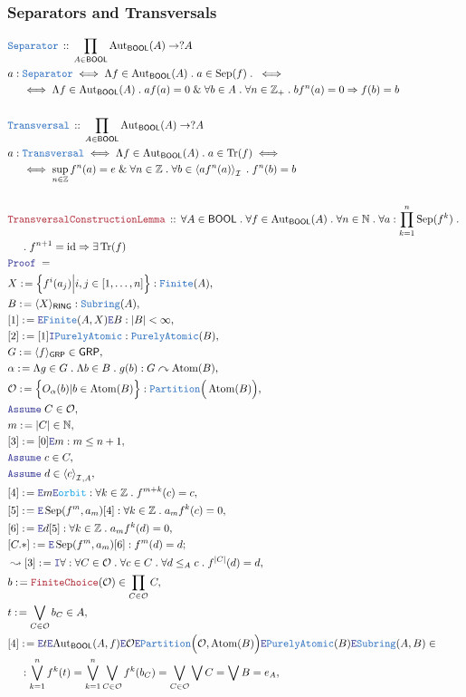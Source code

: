 \documentclass[12pt]{scrartcl}
\newcommand{\TYPE}[1]{\textcolor{NavyBlue}{\mathtt{#1}}}
\newcommand{\FUNC}[1]{\textcolor{Cerulean}{\mathtt{#1}}}
\newcommand{\LOGIC}[1]{\textcolor{Blue}{\mathtt{#1}}}
\newcommand{\THM}[1]{\textcolor{Maroon}{\mathtt{#1}}}
\renewcommand{\.}{\; . \;}
\newcommand{\de}{: \kern 0.1pc =}
\newcommand{\Theorem}[2]{& \THM{#1} \, :: \, #2 \\ & \Proof = \\ }
\newcommand{\DeclareType}[2]{& \TYPE{#1} \, :: \, #2 \\}
\newcommand{\DefineNamedType}[4]{& #1 : \TYPE{#2} \iff #3 \iff #4 \\}
\newcommand{\NewLine}{\\ & \kern 1pc}
\newcommand{\Page}[1]{ \begin{align*} #1 \end{align*}   }
\renewcommand{\And}{\; \& \;}
\newcommand{\Imply}{\Rightarrow}
\newcommand{\Intro}{\LOGIC{I}}
\newcommand{\Elim}{\LOGIC{E}}
\newcommand{\Int}{\mathbb{Z} }
\newcommand{\Nat}{\mathbb{N} }
\DeclareMathOperator*{\id}{id}
\newcommand{\Aut}{\mathrm{Aut}}
\newcommand{\Say}[3]{& #1 \de #2 : #3, \\}
\newcommand{\SayIn}[3]{& #1 \de #2 \in #3, \\}
\newcommand{\Conclude}[3]{& #1 \de #2 : #3; \\}
\newcommand{\Derive}[3]{& \leadsto #1 \de #2 : #3, \\}
\newcommand{\AssumeIn}[2]{& \LOGIC{Assume} \; #1 \in #2, \\}
\newcommand{\Proof}{\LOGIC{Proof} \; }
\newcommand{\Finite}{\TYPE{Finite}}
\newcommand{\genIdeal}[1]{\left\langle #1 \right\rangle_\mathcal{I}}
\newcommand{\ActsOn}{\curvearrowright}
\newcommand{\GRP}{\mathsf{GRP}}
\newcommand{\RING}{\mathsf{RING}}
\renewcommand{\O}{\mathcal{O}}
\newcommand{\PA}{\TYPE{PurelyAtomic}}
\DeclareMathOperator{\Atom}{Atom}
\DeclareMathOperator{\Sep}{Sep}
\DeclareMathOperator{\Tr}{Tr}
\newcommand{\BOOL}{\mathsf{BOOL}}
\begin{document}
\subsubsection{Separators and Transversals}
\Page{
		\DeclareType{Separator}{
			\prod_{A \in \BOOL}
			\Aut_\BOOL(A) \to ?A
		}
		\DefineNamedType{a}{Separator}
		{
			\Lambda f \in 	\Aut_\BOOL(A) \. a \in \Sep(f) \.	
		}
		{
			\NewLine \iff 			
			\Lambda f \in \Aut_\BOOL(A) \.
			af(a) = 0
			\And
			\forall b \in A \. 
			\forall n \in \Int_+ \.
			bf^n(a) = 0
			\Imply
			f(b) = b
		}
		\\
		\DeclareType{Transversal}
		{
			\prod_{A \in \BOOL}
			\Aut_\BOOL(A) \to ?A
		}
		\DefineNamedType{a}{Transversal}
		{
			\Lambda f \in \Aut_\BOOL(A) \. a \in \Tr(f) 	
		}
		{
			\NewLine \iff			
			\sup_{n \in \Int} f^n(a) = e\And
			\forall n \in \Int \.
			\forall b \in \genIdeal{af^n(a)} \.
			f^n(b) = b
		}
		\\
		\Theorem{TransversalConstructionLemma}
		{
			\forall A \in \BOOL \.
			\forall f \in \Aut_\BOOL(A) \.
			\forall n \in \Nat \.
			\forall a : \prod^n_{k=1} \Sep(f^k) \. \NewLine \.
			f^{n+1} = \id \Imply \exists \Tr(f)
		}
		\Say{X}{\Big\{ f^i(a_j) \Big| i,j \in [1,\ldots,n] \Big\}}{\Finite(A)}
		\Say{B}{\langle X \rangle_\RING}{\TYPE{Subring}(A)}
		\Say{[1]}{\Elim \Finite(A,X) \Elim B}{|B|< \infty}
		\Say{[2]}{[1]\Intro \PA}{\PA(B) }
		\SayIn{G}{\langle f  \rangle_\GRP }{\GRP}
		\Say{\alpha}{\Lambda g \in G \. \Lambda b \in B \. g(b)}{ G \ActsOn \Atom(B)}
		\Say{\O}{\Big\{ O_\alpha(b) | b \in \Atom(B)  \Big\}}
		{\TYPE{Partition}\Big(\Atom(B)\Big)}		
		\AssumeIn{C}{\O}
		\SayIn{m}{|C|}{\Nat}
		\Say{[3]}{[0]\Elim m}{m \le n + 1}
		\AssumeIn{c}{C}
		\AssumeIn{d}{{\genIdeal{c}}_{,A}}
		\Say{[4]}{\Elim m \Elim \FUNC{orbit}}
		{
			\forall k \in \Int \. f^{m+k}(c) = c
		}
		\Say{[5]}{\Elim \Sep(f^m,a_m)[4]}{\forall k \in \Int \. a_m f^k(c) = 0}
		\Say{[6]}{\Elim d [5]}{ \forall k \in \Int \.  a_m f^k(d) = 0}
		\Conclude{[C.*]}{\Elim \Sep(f^m,a_m)[6]}{f^m(d) = d}
		\Derive{[3]}{\Intro \forall}
		{
			\forall C \in \O \. 
			\forall c \in C \.
			\forall d \le_A c \.  f^{|C|}(d) = d
		}
		\SayIn{b}{\THM{FiniteChoice}(\O)}{\prod_{C \in \O} C}
		\SayIn{t}{\bigvee_{C \in \O} b_C}{A}
		\SayIn{[4]}{
			\Elim t \Elim \Aut_\BOOL(A,f)
			\Elim \O
			\Elim \TYPE{Partition}\Big(\O, \Atom(B) \Big) \Elim \PA(B)
			\Elim \TYPE{Subring}(A,B)
		}
		{
			\NewLine :			
			\bigvee_{k = 1}^n f^k(t) =  
			\bigvee_{k = 1}^n \bigvee_{C \in \O} f^k(b_C)  =
			\bigvee_{C \in \O} \bigvee  C = 
			\bigvee B = 
			e_A
		}
}
\end{document}
